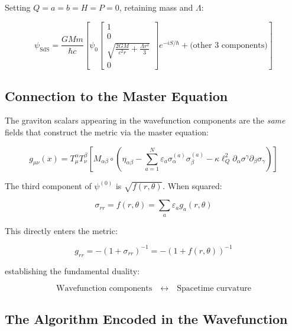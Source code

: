 \documentclass[11pt,a4paper]{article}
\theoremstyle{definition}
\theoremstyle{remark}
\begin{document}
	Setting $Q = a = b = H = P = 0$, retaining mass and $\Lambda$:
	
	\begin{equation}
		\psi_{\text{SdS}} = \frac{GMm}{\hbar c}\left[\psi_0 \begin{bmatrix} 1 \\ 0 \\ \sqrt{\frac{2GM}{c^2r} + \frac{\Lambda r^2}{3}} \\ 0 \end{bmatrix} e^{-iS/\hbar} + \text{(other 3 components)}\right]
		\label{eq:psi_sds}
	\end{equation}
	
	\subsection{Connection to the Master Equation}
	
	The graviton scalars appearing in the wavefunction components are the \emph{same} fields that construct the metric via the master equation:
	
	\begin{equation}
		g_{\mu\nu}(x) = T^\alpha_\mu T^\beta_\nu \left[ M_{\alpha\beta} \circ \left( \eta_{\alpha\beta} - \sum_{a=1}^N \varepsilon_a \sigma_\alpha^{(a)} \sigma_\beta^{(a)} - \kappa \ell_Q^2 \partial_\alpha \sigma^\gamma \partial_\beta \sigma_\gamma \right) \right]
		\label{eq:master_repeat}
	\end{equation}
	
	The third component of $\psi^{(0)}$ is $\sqrt{f(r,\theta)}$. When squared:
	
	\begin{equation}
		\sigma_{rr} = f(r,\theta) = \sum_a \varepsilon_a g_a(r,\theta)
	\end{equation}
	
	This directly enters the metric:
	
	\begin{equation}
		g_{rr} = -\left(1 + \sigma_{rr}\right)^{-1} = -\left(1 + f(r,\theta)\right)^{-1}
		\label{eq:grr_from_wavefunction}
	\end{equation}
	
	establishing the fundamental duality:
	
	\begin{equation}
		\boxed{\text{Wavefunction components} \quad \leftrightarrow \quad \text{Spacetime curvature}}
	\end{equation}
	
	\subsection{The Algorithm Encoded in the Wavefunction}
	
\end{document}
